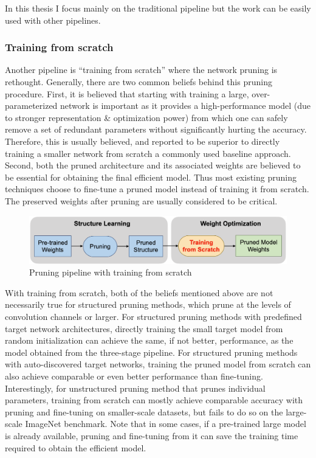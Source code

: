 In this thesis I focus mainly on the traditional pipeline but the work can be
easily used with other pipelines.

\subsubsection{Training from scratch}
Another pipeline is ``training from scratch'' where the network pruning is
rethought.
Generally, there are two common beliefs behind this pruning procedure. First,
it is believed that starting with training a large, over-parameterized network
is important as it provides a high-performance model (due to stronger
representation & optimization power) from which one can safely remove a set of
redundant parameters without significantly hurting the accuracy. Therefore,
this is usually believed, and reported to be superior to directly training a
smaller network from scratch \- a commonly used baseline approach.
Second, both the pruned architecture and its associated weights are believed to
be essential for obtaining the final efficient model. Thus most existing
pruning techniques choose to fine-tune a pruned model instead of training it
from scratch. The preserved weights after pruning are usually considered to be
critical.

\begin{figure}[ht]
    \includegraphics[width=\textwidth]{images/pruning/liu_pipeline.png}
    \centering
    \caption{Pruning pipeline with training from scratch}\label{fig:liu_pipeline}
\end{figure}

With training from scratch, both of the beliefs mentioned above are not
necessarily true for structured pruning methods, which prune at the levels of
convolution channels or larger.
For structured pruning methods with predefined target network architectures,
directly training the small target model from random initialization can achieve
the same, if not better, performance, as the model obtained from the
three-stage pipeline.
For structured pruning methods with auto-discovered target networks, training
the pruned model from scratch can also achieve comparable or even better
performance than fine-tuning.
Interestingly, for unstructured pruning method that prunes individual
parameters, training from scratch can mostly achieve comparable accuracy with
pruning and fine-tuning on smaller-scale datasets, but fails to do so on the
large-scale ImageNet benchmark.
Note that in some cases, if a pre-trained large model is already available,
pruning and fine-tuning from it can save the training time required to obtain
the efficient model.~\cite{liu2018rethinking}

